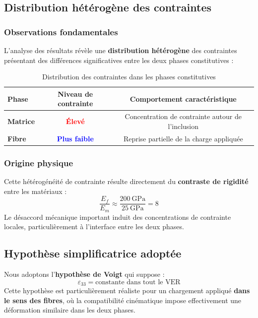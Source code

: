 \documentclass{rapportECL}
\begin{document}
\subsection{Distribution hétérogène des contraintes}

\subsubsection{Observations fondamentales}
L'analyse des résultats révèle une \textbf{distribution hétérogène} des contraintes présentant des différences significatives entre les deux phases constitutives :

\begin{table}[h]
\centering
\caption{Distribution des contraintes dans les phases constitutives}
\begin{tabular}{|l|c|c|}
\hline
\textbf{Phase} & \textbf{Niveau de contrainte} & \textbf{Comportement caractéristique} \\
\hline
\textbf{Matrice} & \textcolor{red}{\textbf{Élevé}} & Concentration de contrainte autour de l'inclusion \\
\textbf{Fibre} & \textcolor{blue}{\textbf{Plus faible}} & Reprise partielle de la charge appliquée \\
\hline
\end{tabular}
\end{table}

\subsubsection{Origine physique}
Cette hétérogénéité de contrainte résulte directement du \textbf{contraste de rigidité} entre les matériaux :
\[
\frac{E_f}{E_m} \approx \frac{200\ \text{GPa}}{25\ \text{GPa}} = 8
\]
Le désaccord mécanique important induit des concentrations de contrainte locales, particulièrement à l'interface entre les deux phases.

\subsection{Hypothèse simplificatrice adoptée}

Nous adoptons l'\textbf{hypothèse de Voigt} qui suppose :
\[
\boxed{\varepsilon_{33} = \text{constante dans tout le VER}}
\]
Cette hypothèse est particulièrement réaliste pour un chargement appliqué \textbf{dans le sens des fibres}, où la compatibilité cinématique impose effectivement une déformation similaire dans les deux phases.
\end{document}
